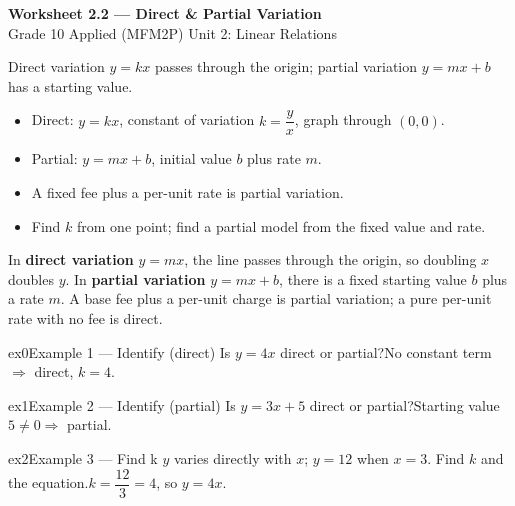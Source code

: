 \documentclass[11pt]{article}
\begin{document}
\begin{center}
{\LARGE\bfseries\color{titleblue}Worksheet 2.2 --- Direct \& Partial Variation}\\[2pt]
{\small Grade 10 Applied (MFM2P) \textperiodcentered{} Unit 2: Linear Relations}
\end{center}

\begin{ideabox}
Direct variation $y=kx$ passes through the origin; partial variation $y=mx+b$ has a starting value.
\begin{itemize}[leftmargin=*,itemsep=2pt]
  \item Direct: $y=kx$, constant of variation $k=\dfrac{y}{x}$, graph through $(0,0)$.
  \item Partial: $y=mx+b$, initial value $b$ plus rate $m$.
  \item A fixed fee plus a per-unit rate is partial variation.
  \item Find $k$ from one point; find a partial model from the fixed value and rate.
\end{itemize}
\end{ideabox}

\begin{learnbox}
In \textbf{direct variation} $y=mx$, the line passes through the origin, so doubling $x$ doubles $y$.
In \textbf{partial variation} $y=mx+b$, there is a fixed starting value $b$ plus a rate $m$.
A base fee plus a per-unit charge is partial variation; a pure per-unit rate with no fee is direct.
\end{learnbox}


\begin{example}{ex0}{Example 1 --- Identify (direct)}
Is $y=4x$ direct or partial?\soln No constant term $\Rightarrow$ direct, $k=4$.
\end{example}

\begin{example}{ex1}{Example 2 --- Identify (partial)}
Is $y=3x+5$ direct or partial?\soln Starting value $5\neq0\Rightarrow$ partial.
\end{example}

\begin{example}{ex2}{Example 3 --- Find k}
$y$ varies directly with $x$; $y=12$ when $x=3$. Find $k$ and the equation.\soln $k=\dfrac{12}{3}=4$, so $y=4x$.
\end{example}
\end{document}
